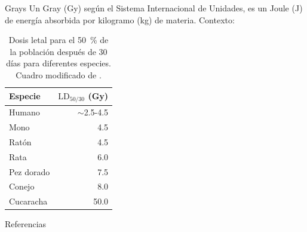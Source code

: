 \documentclass{beamer}
\begin{document}
\appendix
\begin{frame}{Grays}
\label{backup:grays}
Un Gray (\si{\gray}) según el Sistema Internacional de Unidades, es un Joule (\si{\joule}) de energía absorbida por kilogramo (\si{\kilogram}) de materia.
Contexto:
\begin{table}[]
  \centering
  \begin{tabular}{lr}
  \toprule
  Especie & $\mathrm{LD}_{50/30}$ (\si{\gray})\\
  \midrule
  Humano & $\sim$2.5-4.5 \\
  Mono & 4.5 \\
  Ratón & 4.5 \\
  Rata & 6.0 \\
  Pez dorado & 7.5 \\
  Conejo & 8.0 \\
  Cucaracha & 50.0 \\
  \bottomrule
	\end{tabular}%
	\caption{Dosis letal para el \SI{50}{\percent} de la población después de 30 días para diferentes especies. Cuadro modificado de \cite{Bolus2017}. \hyperlink{teng}{}} 
	\label{tab:LD5030}
\end{table}
\end{frame}
\begin{frame}[allowframebreaks]{Referencias}
	
	
\end{frame}
\end{document}
